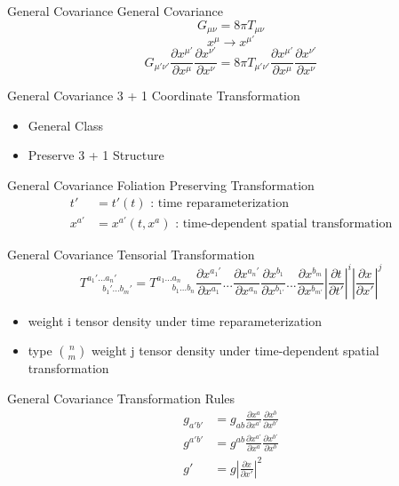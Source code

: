 \documentclass[xcolor=dvipsnames]{beamer}
\begin{document}
	\begin{frame}{General Covariance}
		General Covariance
		\pause
		\Large
		\[
		G_{\mu\nu} = 8\pi T_{\mu\nu}
		\]
		\pause
		\[
		x^{\mu} \rightarrow x^{\mu'}
		\]
		\pause
		\[
		G_{\mu'\nu'}\frac{\partial x^{\mu'}}{\partial x^{\mu}}\frac{\partial x^{\nu'}}{\partial x^{\nu}} = 8 \pi T_{\mu'\nu'}\frac{\partial x^{\mu'}}{\partial x^{\mu}}\frac{\partial x^{\nu'}}{\partial x^{\nu}}
		\]
	\end{frame}
	\begin{frame}{General Covariance}
		3 + 1 Coordinate Transformation
		\begin{itemize}
			\item{General Class}
			\item{Preserve 3 + 1 Structure}
		\end{itemize}
	\end{frame}
	\begin{frame}{General Covariance}
		Foliation Preserving Transformation
		\pause
		\begin{align*}
		t' &= t'(t)\text{  : time reparameterization}\\
		x^{a'} &= x^{a'}(t, x^{a})\text{  : time-dependent spatial transformation}
	\end{align*}
	\end{frame}
	\begin{frame}{General Covariance}
		Tensorial Transformation
		\[
		T^{a_{1}'...a_{n}'}_{~~~~~~~~b_{1}'...b_{m}'} = T^{a_{1}...a_{n}}_{~~~~~~~~b_{1}...b_{n}}\frac{\partial x^{a_{1}'}}{\partial x^{a_{1}}}...\frac{\partial x^{a_{n}'}}{\partial x^{a_{n}}}\frac{\partial x^{b_{1}}}{\partial x^{b_{1'}}}...\frac{\partial x^{b_{m}}}{\partial x^{b_{m'}}}\left|\frac{\partial t}{\partial t'}\right|^{i}\left|\frac{\partial x}{\partial x'}\right|^{j} 
		\]
		\pause
		\begin{itemize}
			\item{weight i tensor density under time reparameterization}
			\item{type $n\choose m$ weight j tensor density under time-dependent spatial transformation}
		\end{itemize}
	\end{frame}
	\begin{frame}{General Covariance}
		Transformation Rules
		\begin{align*}
		g_{a'b'} & = g_{ab}\frac{\partial x^{a}}{\partial x^{a'}}\frac{\partial x^{b}}{\partial x^{b'}}\\
		g^{a'b'} & = g^{ab}\frac{\partial x^{a'}}{\partial x^{a}}\frac{\partial x^{b'}}{\partial x^{b}}\\
		g' & = g\left|\frac{\partial x}{\partial x'}\right|^{2}
	\end{align*}
	\end{frame}
\end{document}
